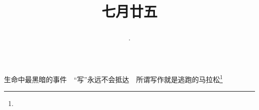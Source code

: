 \title{\date[d=28,m=8,y=2024][year:cn-y,年,month:cn,day:cn,日,·,weekday]·七月廿五 }
生命中最黑暗的事件　“写”永远不会抵达　所谓写作就是逃跑的马拉松\footnote{ }

